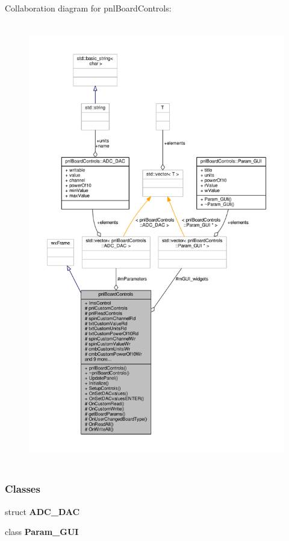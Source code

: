 Collaboration diagram for pnl\+Board\+Controls\+:
\nopagebreak
\begin{figure}[H]
\begin{center}
\leavevmode
\includegraphics[height=550pt]{d8/de7/classpnlBoardControls__coll__graph}
\end{center}
\end{figure}
\subsubsection*{Classes}
\begin{DoxyCompactItemize}
\item 
struct {\bf A\+D\+C\+\_\+\+D\+AC}
\item 
class {\bf Param\+\_\+\+G\+UI}
\end{DoxyCompactItemize}
